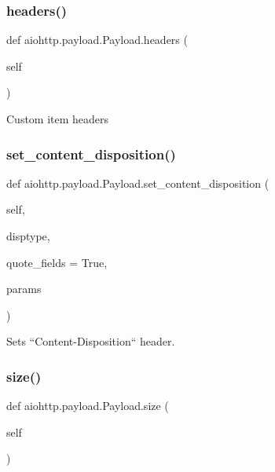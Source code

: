 \subsubsection{\texorpdfstring{headers()}{headers()}}
{\footnotesize\ttfamily def aiohttp.\+payload.\+Payload.\+headers (\begin{DoxyParamCaption}\item[{}]{self }\end{DoxyParamCaption})}

\begin{DoxyVerb}Custom item headers\end{DoxyVerb}
 \mbox{\label{classaiohttp_1_1payload_1_1_payload_a05112789187141cf733c92a339d3ac6b}} 
\subsubsection{\texorpdfstring{set\+\_\+content\+\_\+disposition()}{set\_content\_disposition()}}
{\footnotesize\ttfamily def aiohttp.\+payload.\+Payload.\+set\+\_\+content\+\_\+disposition (\begin{DoxyParamCaption}\item[{}]{self,  }\item[{}]{disptype,  }\item[{}]{quote\+\_\+fields = {\ttfamily True},  }\item[{}]{params }\end{DoxyParamCaption})}

\begin{DoxyVerb}Sets ``Content-Disposition`` header.\end{DoxyVerb}
 \mbox{\label{classaiohttp_1_1payload_1_1_payload_a86046afc253ab3fef11df56e55248269}} 
\subsubsection{\texorpdfstring{size()}{size()}}
{\footnotesize\ttfamily def aiohttp.\+payload.\+Payload.\+size (\begin{DoxyParamCaption}\item[{}]{self }\end{DoxyParamCaption})}

